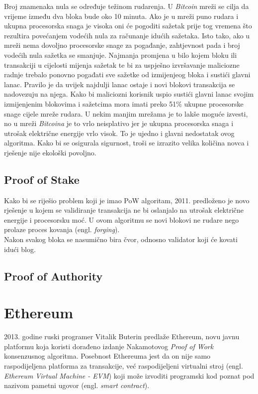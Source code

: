 \documentclass[times, utf8, zavrsni]{fer}
\begin{document}
Broj znamenaka nula se određuje težinom rudarenja. U \emph{Bitcoin} mreži se cilja da vrijeme između dva bloka bude oko 10 minuta.
Ako je u mreži puno rudara i ukupna procesorska snaga je visoka oni će pogoditi sažetak prije tog vremena što rezultira povećanjem vodećih nula za računanje idućih sažetaka. 
Isto tako, ako u mreži nema dovoljno procesorske snage za pogađanje, zahtjevnost pada i broj vodećih nula sažetka se smanjuje. 
Najmanja promjena u bilo kojem bloku ili transakciji u cijelosti mijenja sažetak te bi za uspješno izvršavanje maliciozne radnje
trebalo ponovno pogađati sve sažetke od izmijenjeog bloka i sustići glavni lanac. Pravilo je da uvijek najdulji lanac ostaje i novi blokovi transakcija se nadovezuju na njega.
Kako bi maliciozni korisnik uspio sustići glavni lanac svojim izmijenjenim blokovima i sažetcima mora imati preko 51\% ukupne procesorske snage cijele mreže rudara.
U nekim manjim mrežama je to lakše moguće izvesti, no u mreži \emph{Bitcoina} je to vrlo neisplativo jer je ukupna procesorska snaga i utrošak električne energije vrlo visok.
To je ujedno i glavni nedostatak ovog algoritma. Kako bi se osigurala sigurnost, troši se izrazito velika količina novca i rješenje nije ekološki povoljno.

\section{Proof of Stake}
Kako bi se riješio problem koji je imao PoW algoritam, 2011. predloženo je novo rješenje u kojem se validiranje transakcija ne bi oslanjalo na utrošak električne energije
i procesorsku moć. U ovom algoritmu se novi blokovi ne rudare nego prolaze proces kovanja (engl. \emph{forging}). \\
Nakon svakog bloka se nasumično bira čvor, odnosno validator koji će kovati idući blog.

\section{Proof of Authority}

\chapter{Ethereum}
2013. godine ruski programer Vitalik Buterin predlaže Ethereum, novu javnu platformu koja koristi 
dorađeno izdanje Nakamotovog \emph{Proof of Work} konsenzusnog algoritma. Posebnost Ethereuma jest da on nije
samo raspodijeljena platforma za transakcije, već raspodijeljeni virtualni stroj (engl. \emph{Ethereum Virtual Machine - EVM})
 koji može izvoditi programski kod poznat pod nazivom pametni ugovor (engl. \emph{smart contract}). 
\end{document}
